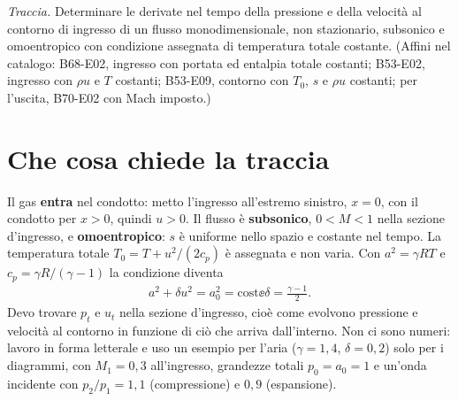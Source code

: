 

\graphicspath{{../../svolgimenti/1975-01-01_E03_ingresso_temperatura_totale/figure/}}

\newcommand{\uma}{u-a}
\newcommand{\upa}{u+a}
\newcommand{\Ru}{R_1}
\newcommand{\Rd}{R_2}
\newcommand{\Cr}{C}



\maketitle

\emph{Traccia.} Determinare le derivate nel tempo della pressione e della velocità al contorno di ingresso di un
flusso monodimensionale, non stazionario, subsonico e omoentropico con condizione assegnata di temperatura totale
costante. (Affini nel catalogo: B68-E02, ingresso con portata ed entalpia totale costanti; B53-E02, ingresso con
$\rho u$ e $T$ costanti; B53-E09, contorno con $T_0$, $s$ e $\rho u$ costanti; per l'uscita, B70-E02 con Mach
imposto.)

\section*{Che cosa chiede la traccia}
Il gas \textbf{entra} nel condotto: metto l'ingresso all'estremo sinistro, $x=0$, con il condotto per $x>0$, quindi
$u>0$. Il flusso è \textbf{subsonico}, $0<M<1$ nella sezione d'ingresso, e \textbf{omoentropico}: $s$ è uniforme
nello spazio e costante nel tempo. La temperatura totale $T_0=T+u^2/(2c_p)$ è assegnata e non varia. Con
$a^2=\gamma RT$ e $c_p=\gamma R/(\gamma-1)$ la condizione diventa
\begin{gather*}
  a^2+\delta u^2=a_0^2=\text{cost} \ee \delta=\frac{\gamma-1}{2}.
\end{gather*}
Devo trovare $p_t$ e $u_t$ nella sezione d'ingresso, cioè come evolvono pressione e velocità al contorno in
funzione di ciò che arriva dall'interno. Non ci sono numeri: lavoro in forma letterale e uso un esempio per l'aria
($\gamma=1{,}4$, $\delta=0{,}2$) solo per i diagrammi, con $M_1=0{,}3$ all'ingresso, grandezze totali $p_0=a_0=1$ e
un'onda incidente con $p_2/p_1=1{,}1$ (compressione) e $0{,}9$ (espansione).

